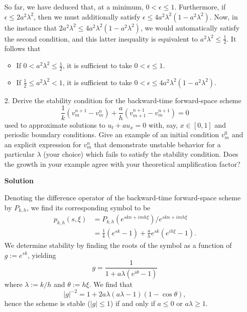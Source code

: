 \documentclass{article}
\providecommand{\abs}[1]{\left\lvert#1\right\rvert}
\begin{document}
\begin{itemize}
So far, we have deduced that, at a minimum, $0 < \epsilon \leq 1$. Furthermore, if $\epsilon \leq 2 a^2 \lambda^2$, then we must additionally satisfy $\epsilon \leq 4 a^2 \lambda^2 \left( 1 - a^2 \lambda^2 \right)$. Now, in the instance that $2 a^2 \lambda^2 \leq 4 a^2 \lambda^2 \left( 1 - a^2 \lambda^2 \right)$, we would automatically satisfy the second condition, and this latter inequality is equivalent to $a^2 \lambda^2 \leq \frac{1}{2}$. It follows that
\begin{itemize}
\item If $0 < a^2 \lambda^2 \leq \frac{1}{2}$, it is sufficient to take $0 < \epsilon \leq 1$.
\item If $\frac{1}{2} \leq a^2 \lambda^2 < 1$, it is sufficient to take $0 < \epsilon \leq 4 a^2 \lambda^2 \left( 1 - a^2 \lambda^2 \right)$.
\end{itemize}

\item[2.] Derive the stability condition for the backward-time forward-space scheme
\begin{equation*}
\frac{1}{k} \left( v^{n+1}_m - v^n_m \right) + \frac{a}{h} \left( v^{n+1}_{m+1} - v^{n+1}_m \right) = 0
\end{equation*}
used to approximate solutions to $u_t + a u_x = 0$ with, say, $x \in [0,1]$ and periodic boundary conditions. Give an example of an initial condition $v^0_m$ and an explicit expression for $v^n_m$ that demonstrate unstable behavior for a particular $\lambda$ (your choice) which fails to satisfy the stability condition. Does the growth in your example agree with your theoretical amplification factor?

\textbf{Solution}

Denoting the difference operator of the backward-time forward-space scheme by $P_{k,h}$, we find its corresponding symbol to be
\begin{align*}
p_{k,h}(s,\xi) & = P_{k,h} \left( e^{skn + imh\xi} \right) / e^{skn + imh\xi} \\
               & = \frac{1}{k} \left( e^{sk} - 1 \right) + \frac{a}{h} e^{sk} \left( e^{ih\xi} - 1 \right).
\end{align*}
We determine stability by finding the roots of the symbol as a function of $g := e^{sk}$, yielding
\begin{equation*}
g = \frac{1}{1 + a \lambda \left( e^{i\theta} - 1 \right)}
\end{equation*}
where $\lambda := k/h$ and $\theta := h \xi$. We find that
\begin{equation*}
\abs{g}^{-2} = 1 + 2 a \lambda \left( a \lambda - 1 \right) \left( 1 - \cos \theta \right),
\end{equation*}
hence the scheme is stable ($\abs{g} \leq 1$) if and only if $a \leq 0$ or $a \lambda \geq 1$.


\end{itemize}
\end{document}
